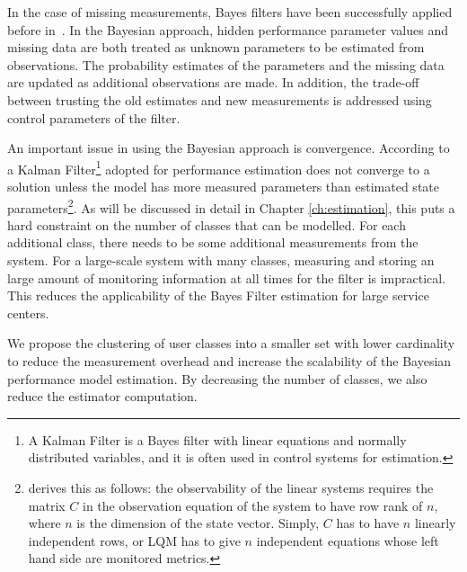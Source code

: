 In the case of missing measurements, Bayes filters have been successfully applied before in~\cite{woodside_use_2005,xu_performance_2005,zheng_tracking_2005}. In the Bayesian approach, hidden performance parameter values and missing data are both treated as unknown parameters to be estimated from observations. The probability estimates of the parameters and the missing data are updated as additional observations are made. In addition, the trade-off between trusting the old estimates and new measurements is addressed using control parameters of the filter. 

An important issue in using the Bayesian approach is convergence. 
According to \cite{zheng_performance_2008} a Kalman Filter\cite{watson_kalman_1983}\footnote{A Kalman Filter is a Bayes filter with linear equations and normally distributed variables, and it is often used in control systems for estimation.} adopted for performance estimation does not converge to a solution unless the model has more measured parameters than estimated state parameters\footnote{\cite{zheng_performance_2008} derives this as follows: the observability of the linear systems requires the matrix $C$ in the observation equation of the system to have row rank of $n$, where $n$ is the dimension of the state vector. Simply, $C$ has to have $n$ linearly independent rows, or LQM has to give $n$ independent equations whose left hand side are monitored metrics.}. 
As will be discussed in detail in Chapter \ref{ch:estimation}, this puts a hard constraint on the number of classes that can be modelled. 
For each additional class, there needs to be some additional measurements from the system. 
For a large-scale system with many classes, measuring and storing an large amount of monitoring information at all times for the filter is impractical.
This reduces the applicability of the Bayes Filter estimation for large service centers.

We propose the clustering of user classes into a smaller set with lower cardinality to reduce the measurement overhead and increase the scalability of the Bayesian performance model estimation. 
By decreasing the number of classes, we also reduce the estimator computation.

